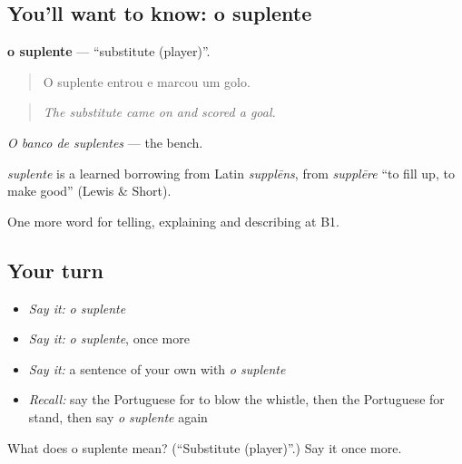 \subsection*{You'll want to know: o suplente}
\textbf{o suplente} — \textquotedblleft{}substitute (player)\textquotedblright{}.

\begin{quote}
O suplente entrou e marcou um golo.
\end{quote}

\begin{quote}
\emph{The substitute came on and scored a goal.}
\end{quote}

\emph{O banco de suplentes} — the bench.

\begin{cousinweb}
\emph{suplente} is a learned borrowing from Latin \emph{supplēns}, from \emph{supplēre} \textquotedblleft{}to fill up, to make good\textquotedblright{} (Lewis \& Short).
\end{cousinweb}

\begin{grammarlens}[title={What you've built}]
One more word for telling, explaining and describing at B1.
\end{grammarlens}

\subsection*{Your turn}
\begin{itemize}
\raggedright
  \item \emph{Say it:} \emph{o suplente}
  \item \emph{Say it:} \emph{o suplente}, once more
  \item \emph{Say it:} a sentence of your own with \emph{o suplente}
  \item \emph{Recall:} say the Portuguese for to blow the whistle, then the Portuguese for stand, then say \emph{o suplente} again
\end{itemize}

\begin{tcolorbox}[breakable,colback=teal!4,colframe=teal!35!black,title={Before you move on}]
What does o suplente mean? (\textquotedblleft{}Substitute (player)\textquotedblright{}.) Say it once more.
\end{tcolorbox}
